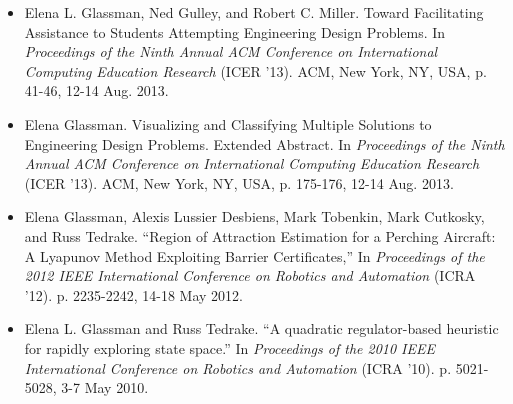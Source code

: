\documentclass[margin]{res}
\begin{document}
\begin{resume}
\begin{itemize}
\item Elena L. Glassman, Ned Gulley, and Robert C. Miller. Toward Facilitating Assistance to Students Attempting Engineering Design Problems. In {\it Proceedings of the Ninth Annual ACM Conference on International Computing Education Research} (ICER '13). ACM, New York, NY, USA, p. 41-46, 12-14 Aug. 2013.


\item Elena Glassman. Visualizing and Classifying Multiple Solutions to Engineering Design Problems. Extended Abstract. In {\it Proceedings of the Ninth Annual ACM Conference on International Computing Education Research} (ICER '13). ACM, New York, NY, USA, p. 175-176, 12-14 Aug. 2013.


\item Elena Glassman, Alexis Lussier Desbiens, Mark Tobenkin, Mark Cutkosky, and Russ Tedrake. ``Region of Attraction Estimation for a Perching Aircraft: A Lyapunov Method Exploiting Barrier Certificates,'' In {\it Proceedings of the 2012 IEEE International Conference on Robotics and Automation} (ICRA '12). p. 2235-2242, 14-18 May 2012.


\item Elena L. Glassman and Russ Tedrake. ``A quadratic regulator-based heuristic for rapidly exploring state space.'' In {\it Proceedings of the 2010 IEEE International Conference on Robotics and Automation} (ICRA '10). p. 5021-5028, 3-7 May 2010. 


\end{itemize}
\end{resume}
\end{document}
